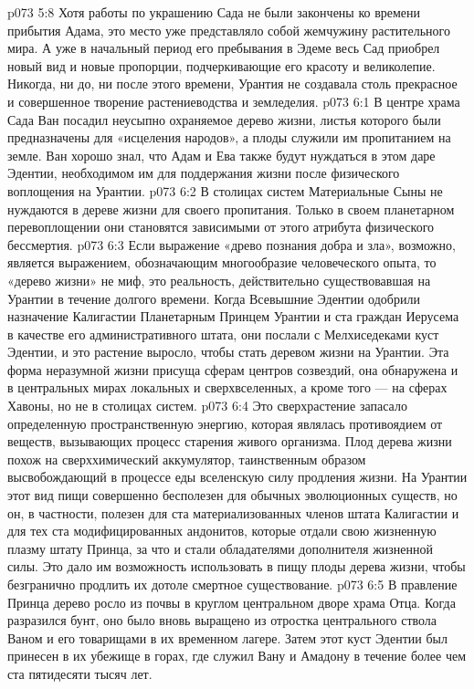 \vs p073 5:8 Хотя работы по украшению Сада не были закончены ко времени прибытия Адама, это место уже представляло собой жемчужину растительного мира. А уже в начальный период его пребывания в Эдеме весь Сад приобрел новый вид и новые пропорции, подчеркивающие его красоту и великолепие. Никогда, ни до, ни после этого времени, Урантия не создавала столь прекрасное и совершенное творение растениеводства и земледелия.
\vs p073 6:1 В центре храма Сада Ван посадил неусыпно охраняемое дерево жизни, листья которого были предназначены для «исцеления народов», а плоды служили им пропитанием на земле. Ван хорошо знал, что Адам и Ева также будут нуждаться в этом даре Эдентии, необходимом им для поддержания жизни после физического воплощения на Урантии.
\vs p073 6:2 В столицах систем Материальные Сыны не нуждаются в дереве жизни для своего пропитания. Только в своем планетарном перевоплощении они становятся зависимыми от этого атрибута физического бессмертия.
\vs p073 6:3 \pc Если выражение «древо познания добра и зла», возможно, является выражением, обозначающим многообразие человеческого опыта, то «дерево жизни» не миф, это реальность, действительно существовавшая на Урантии в течение долгого времени. Когда Всевышние Эдентии одобрили назначение Калигастии Планетарным Принцем Урантии и ста граждан Иерусема в качестве его административного штата, они послали с Мелхиседеками куст Эдентии, и это растение выросло, чтобы стать деревом жизни на Урантии. Эта форма неразумной жизни присуща сферам центров созвездий, она обнаружена и в центральных мирах локальных и сверхвселенных, а кроме того --- на сферах Хавоны, но не в столицах систем.
\vs p073 6:4 Это сверхрастение запасало определенную пространственную энергию, которая являлась противоядием от веществ, вызывающих процесс старения живого организма. Плод дерева жизни похож на сверххимический аккумулятор, таинственным образом высвобождающий в процессе еды вселенскую силу продления жизни. На Урантии этот вид пищи совершенно бесполезен для обычных эволюционных существ, но он, в частности, полезен для ста материализованных членов штата Калигастии и для тех ста модифицированных андонитов, которые отдали свою жизненную плазму штату Принца, за что и стали обладателями дополнителя жизненной силы. Это дало им возможность использовать в пищу плоды дерева жизни, чтобы безгранично продлить их дотоле смертное существование.
\vs p073 6:5 \pc В правление Принца дерево росло из почвы в круглом центральном дворе храма Отца. Когда разразился бунт, оно было вновь выращено из отростка центрального ствола Ваном и его товарищами в их временном лагере. Затем этот куст Эдентии был принесен в их убежище в горах, где служил Вану и Амадону в течение более чем ста пятидесяти тысяч лет.
